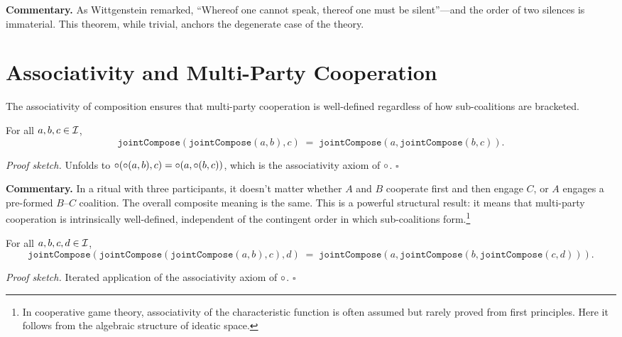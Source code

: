 \noindent\textbf{Commentary.}
As Wittgenstein remarked, ``Whereof one cannot speak, thereof one must be
silent''---and the order of two silences is immaterial.  This theorem, while
trivial, anchors the degenerate case of the theory.

\section{Associativity and Multi-Party Cooperation}
\label{sec:ch16-assoc}

The associativity of composition ensures that multi-party cooperation is
well-defined regardless of how sub-coalitions are bracketed.

\begin{theorem}
\label{thm:joint_assoc}
For all $a, b, c \in \mathcal{I}$,
\[
  \texttt{jointCompose}(\texttt{jointCompose}(a, b), c) \;=\;
  \texttt{jointCompose}(a, \texttt{jointCompose}(b, c)).
\]
\end{theorem}

\noindent\textit{Proof sketch.}\quad
Unfolds to $\circ(\circ(a,b), c) = \circ(a, \circ(b,c))$,
which is the associativity axiom of $\circ$.
\hfill$\square$

\medskip

\noindent\textbf{Commentary.}
In a ritual with three participants, it doesn't matter whether $A$ and $B$
cooperate first and then engage $C$, or $A$ engages a pre-formed $B$--$C$
coalition.  The overall composite meaning is the same.  This is a powerful
structural result: it means that multi-party cooperation is intrinsically
well-defined, independent of the contingent order in which sub-coalitions
form.\footnote{In cooperative game theory, associativity of the
characteristic function is often assumed but rarely proved from first
principles.  Here it follows from the algebraic structure of ideatic
space.}

\begin{theorem}
\label{thm:four_party_assoc}
For all $a, b, c, d \in \mathcal{I}$,
\[
  \texttt{jointCompose}(\texttt{jointCompose}(\texttt{jointCompose}(a, b), c), d) \;=\;
  \texttt{jointCompose}(a, \texttt{jointCompose}(b, \texttt{jointCompose}(c, d))).
\]
\end{theorem}

\noindent\textit{Proof sketch.}\quad
Iterated application of the associativity axiom of $\circ$.
\hfill$\square$

